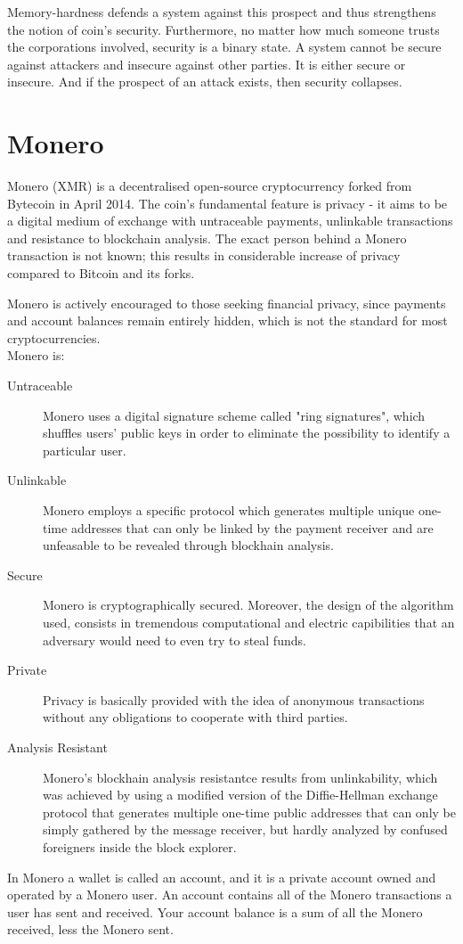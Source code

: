 Memory-hardness defends a system against this prospect and thus strengthens the notion of coin's security. Furthermore, no matter how much someone trusts the corporations involved, security is a binary state. A system cannot be secure against attackers and insecure against other parties. It is either secure or insecure. And if the prospect of an attack exists, then security collapses.
%
\section{Monero}
Monero (XMR) is a decentralised open-source cryptocurrency forked from Bytecoin in April 2014. The coin's fundamental feature is privacy - it aims to be a digital medium of exchange with untraceable payments, unlinkable transactions and resistance to blockchain analysis. The exact person behind a Monero transaction is not known; this results in considerable increase of privacy compared to Bitcoin and its forks.~\cite{monerodef}

Monero is actively encouraged to those seeking financial privacy, since payments and account balances remain entirely hidden, which is not the standard for most cryptocurrencies.\\

\noindent Monero is:~\cite{monero}
\begin{description}
  \item [Untraceable] Monero uses a digital signature scheme called "ring signatures", which shuffles users' public keys in order to eliminate the possibility to identify a particular user.
  \item [Unlinkable] Monero employs a specific protocol which generates multiple unique one-time addresses that can only be linked by the payment receiver and are unfeasable to be revealed through blockhain analysis.
  \item [Secure] Monero is cryptographically secured. Moreover, the design of the algorithm used, consists in tremendous computational and electric capibilities that an adversary would need to even try to steal funds.
  \item [Private] Privacy is basically provided with the idea of anonymous transactions without any obligations to cooperate with third parties.
  \item [Analysis Resistant] Monero's blockhain analysis resistantce results from unlinkability, which was achieved by using a modified version of the Diffie-Hellman exchange protocol that generates multiple one-time public addresses that can only be simply gathered by the message receiver, but hardly analyzed by confused foreigners inside the block explorer.
\end{description}
%
In Monero a wallet is called an account, and it is a private account owned and operated by a Monero user. An account contains all of the Monero transactions a user has sent and received. Your account balance is a sum of all the Monero received, less the Monero sent.

